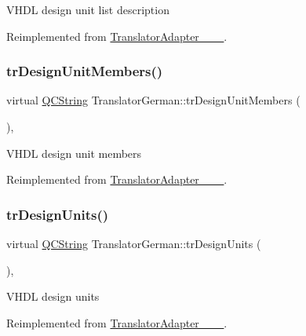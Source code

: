V\+H\+DL design unit list description 

Reimplemented from \mbox{\hyperlink{class_translator_adapter__1__8__15}{Translator\+Adapter\+\_\+\_\+\_}}.

\mbox{\label{class_translator_german_a1bc88a369e1802d493c218cda7491ede}} 
\subsubsection{\texorpdfstring{trDesignUnitMembers()}{trDesignUnitMembers()}}
{\footnotesize\ttfamily virtual \mbox{\hyperlink{class_q_c_string}{Q\+C\+String}} Translator\+German\+::tr\+Design\+Unit\+Members (\begin{DoxyParamCaption}{ }\end{DoxyParamCaption})\hspace{0.3cm}{\ttfamily [inline]}, {\ttfamily [virtual]}}

V\+H\+DL design unit members 

Reimplemented from \mbox{\hyperlink{class_translator_adapter__1__8__15}{Translator\+Adapter\+\_\+\_\+\_}}.

\mbox{\label{class_translator_german_a2fa1eefb9fd013ec26109ff5b77a85a1}} 
\subsubsection{\texorpdfstring{trDesignUnits()}{trDesignUnits()}}
{\footnotesize\ttfamily virtual \mbox{\hyperlink{class_q_c_string}{Q\+C\+String}} Translator\+German\+::tr\+Design\+Units (\begin{DoxyParamCaption}{ }\end{DoxyParamCaption})\hspace{0.3cm}{\ttfamily [inline]}, {\ttfamily [virtual]}}

V\+H\+DL design units 

Reimplemented from \mbox{\hyperlink{class_translator_adapter__1__8__15}{Translator\+Adapter\+\_\+\_\+\_}}.

\mbox{\label{class_translator_german_a2c82986afd594ea021256805606462fb}} 
